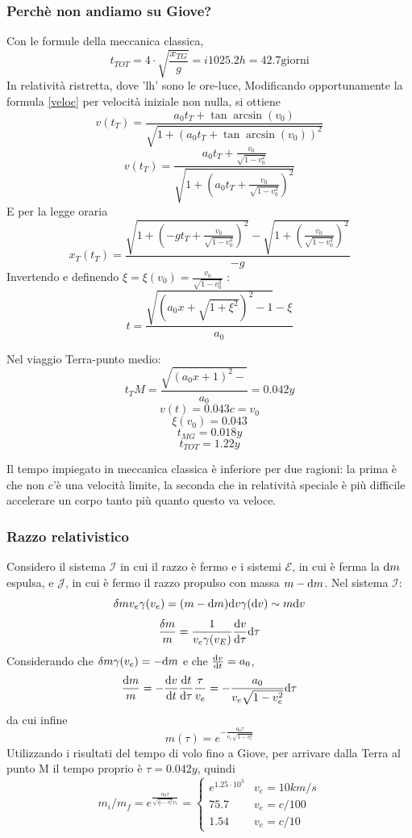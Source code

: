 \subsubsection {Perch\`e non andiamo su Giove?}
Con le formule della meccanica classica,
\[ t_{TOT} = 4\cdot \sqrt{\frac{x_{TG}}{g}} =i 1025.2h = 42.7 \mathrm{giorni} \]
In relativit\`a ristretta, dove 'lh' sono le ore-luce,
Modificando opportunamente la formula \ref{veloc} per velocit\`a iniziale non nulla, si ottiene
\[ v(t_T) = \frac{a_0 t_T + \tan\arcsin(v_0)          }
	{\sqrt{1+( a_0t_T + \tan\arcsin(v_0)           )^2 }}  \]
\[ v(t_T) = \frac{a_0 t_T + \frac{v_0}{\sqrt{1-v_0^2}} }
	{\sqrt{1+( a_0t_T + \frac{v_0}{\sqrt{1-v_0^2}}  )^2 }}  \]
E per la legge oraria
\[ x_T(t_T) = \frac{\sqrt{1+ (-gt_T + \frac{v_0}{\sqrt{1-v_0^2}})^2 } - 
	\sqrt{1+  (\frac{v_0}{\sqrt{1-v_0^2}})^2}     }{-g} \]
Invertendo e definendo \( \xi = \xi(v_0) = \frac{v_0}{\sqrt{1-v_0^2}} \) :
\[ t = \frac{\sqrt{(a_0x+\sqrt{1+\xi^2})^2-1} -\xi}{a_0} \]

Nel viaggio Terra-punto medio:
\[ t_TM = \frac{\sqrt{(a_0x+1)^2- }}{a_0} = 0.042y \]
\[ v(t) = 0.043c = v_0\]
\[ \xi(v_0) = 0.043 \]
\[ t_{MG} = 0.018y \]
\[t_{TOT} = 1.22y \]

Il tempo impiegato in meccanica classica \`e inferiore per due ragioni: la prima \`e che non c'\`e una velocit\`a limite, la seconda che in relativit\`a speciale \`e pi\`u difficile accelerare un corpo tanto pi\`u quanto questo va veloce.


\subsubsection{Razzo relativistico}
Considero il sistema $\mathcal{I}$ in cui il razzo \`e fermo e i sistemi $\mathcal{E}$, in cui \`e ferma la $\mathrm{d} m$ espulsa, e $\mathcal{J}$, in cui \`e fermo il razzo propulso con massa $m-\mathrm{d} m$. Nel sistema $\mathcal{I}$:
\[ \delta m v_e \gamma(v_e) = (m - \mathrm{d} m) \mathrm{d} v \gamma(\mathrm{d} v) \sim m \mathrm{d} v \]
\[ \frac{\delta m}{m} = \frac{1}{v_e \gamma(v_E)} \frac{\mathrm{d} v}{\mathrm{d}\tau} \mathrm{d}\tau \]
Considerando che \( \delta m \gamma(v_e)  = -\mathrm{d} m \) e che \( \frac{\mathrm{d} v}{\mathrm{d} t} = a_0 \),
\[ \frac{\mathrm{d} m}{m} = -\frac{\mathrm{d} v}{\mathrm{d} t} \frac{\mathrm{d} t}{\mathrm{d} \tau} \frac{\tau}{v_e} = -\frac{a_0}{v_e\sqrt{1-v_e^2}}\mathrm{d} \tau \]
da cui infine
\[ m(\tau) = e^{-\frac{a_0\tau}{v_e \sqrt{1-v_e^2}}} \]
Utilizzando i risultati del tempo di volo fino a Giove, per arrivare dalla Terra al punto M il tempo proprio \`e \(\tau = 0.042y \), quindi
\[ m_i/m_f = e^{\frac{a_0\tau}{\sqrt{q-v_e^2}v_e}} = 
\begin{cases}
	e^{1.25\cdot10^3} & v_e = 10km/s \\
	75.7              & v_e = c/100 \\
	1.54              & v_e = c/10 
\end{cases} 
\]
	

